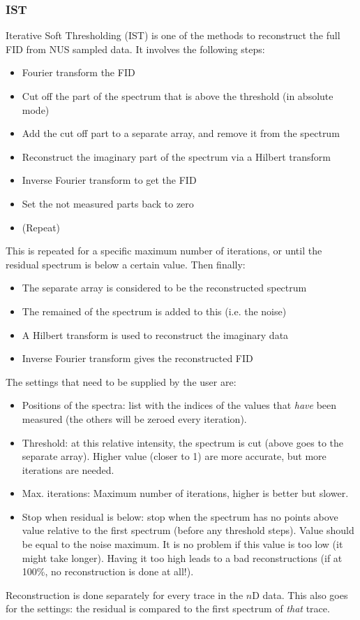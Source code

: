 \documentclass[11pt,a4paper]{article}
\begin{document}
\subsubsection{IST}
Iterative Soft Thresholding (IST) is one of the methods to reconstruct the full FID from NUS sampled data. It involves the following steps:
\begin{itemize}
  \item Fourier transform the FID
  \item Cut off the part of the spectrum that is above the threshold (in absolute mode)
  \item Add the cut off part to a separate array, and remove it from the spectrum
  \item Reconstruct the imaginary part of the spectrum via a Hilbert transform
  \item Inverse Fourier transform to get the FID
  \item Set the not measured parts back to zero
\item (Repeat)
\end{itemize}
This is repeated for a specific maximum number of iterations, or until the residual spectrum is below a certain value. 
Then finally:
\begin{itemize}
  \item The separate array is considered to be the reconstructed spectrum
  \item The remained of the spectrum is added to this (i.e. the noise)
  \item A Hilbert transform is used to reconstruct the imaginary data
  \item Inverse Fourier transform gives the reconstructed FID
\end{itemize}
The settings that need to be supplied by the user are:
\begin{itemize}
  \item Positions of the spectra: list with the indices of the values that \textit{have} been measured (the others will be zeroed every iteration).
  \item Threshold: at this relative intensity, the spectrum is cut (above goes to the separate array). Higher value (closer to 1) are more accurate, but more iterations are needed.
  \item Max. iterations: Maximum number of iterations, higher is better but slower.
  \item Stop when residual is below: stop when the spectrum has no points above value relative to the first spectrum (before any threshold steps). Value should be equal to the noise maximum.
	 It is no problem if this value is too low (it might take longer). Having it too high leads to a bad reconstructions (if at 100\%, no reconstruction is done at all!).  
\end{itemize}
Reconstruction is done separately for every trace in the $n$D data. This also goes for the settings: the residual is compared to the first spectrum of \textit{that} trace.
\end{document}
